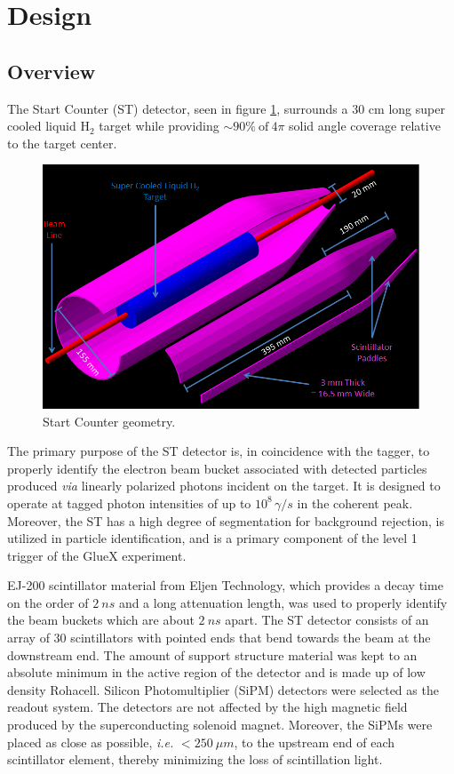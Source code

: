 \section{Design} \label{design}
\subsection{Overview}
The Start Counter (ST) detector, seen in figure \ref{fig:st-geo}, surrounds a 30 cm long super cooled liquid $\mathrm{H_{2}}$ target while providing $\sim 90 \%\ \mathrm{of}\ 4 \pi$ solid angle coverage relative to the target center.
\begin{figure}[!htb]
	\centering
	\includegraphics[width=1.0\columnwidth]{design/figs/30_Element_Pieces_Removed}
	\caption[Start Counter geometry]{Start Counter geometry.}
	\label{fig:st-geo}
\end{figure}
The primary purpose of the ST detector is, in coincidence with the tagger, to properly identify the electron beam bucket associated with detected particles produced \textit{via} linearly polarized photons incident on the target. It is designed to operate at tagged photon intensities of up to $10^{8}\,\gamma/s$ in the coherent peak.  Moreover, the ST has a high degree of segmentation for background rejection, is utilized in particle identification, and is a primary component of the level 1 trigger of the GlueX experiment.

EJ-200 scintillator material from Eljen Technology, which provides a decay time on the order of $2\ ns$ and a long attenuation length, was used to properly identify the beam buckets which are about $2\ ns$ apart\cite{pooser16}.  The ST detector consists of an array of 30 scintillators with pointed ends that bend towards the beam at the downstream end. The amount of support structure material was kept to an absolute minimum in the active region of the detector and is made up of low density Rohacell\textregistered. Silicon Photomultiplier (SiPM) detectors were selected as the readout system. The detectors are not affected by the high magnetic field produced by the superconducting solenoid magnet. Moreover, the SiPMs were placed as close as possible, \textit{i.e.} $< 250\ \mu m$, to the upstream end of each scintillator element, thereby minimizing the loss of scintillation light\cite{pooser16}.

